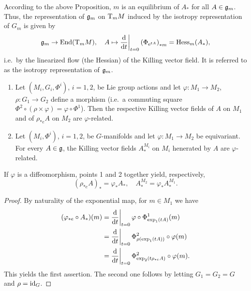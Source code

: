 \begin{rem}
    According to the above Proposition, $m$ is an equilibrium of $A_\ast$ for all $A\in\mathfrak{g}_m$. Thus, the representation of $\mathfrak{g}_m$ on $\mathrm{T}_mM$ induced by the isotropy representation of $G_m$ is given by
    \[\frakg_m\to \End(\T_mM),\quad A\mapsto \restr{\frac{\dd}{\dd t}}{t=0} \left(\Phi_{\rme^{tA}}\right)_{\ast m}=\mathrm{Hess}_m(A_\ast),\]
    i.e.~by the linearized flow (the Hessian) of the Killing vector field. It is referred to as the isotropy representation of $\mathfrak{g}_m$.
\end{rem}

\begin{prop}\label{prop 6.2.4 RS1}
    \begin{enumerate}
        \item Let $(M_i,G_i,\Phi^i)$, $i=1,2$, be Lie group actions and let $\varphi:M_1\to M_2$, $\rho:G_1\to G_2$ define a morphism (i.e.~a commuting square $\Phi^2\circ(\rho\times\varphi)=\varphi\circ\Phi^1$). Then the respective Killing vector fields of $A$ on $M_1$ and of $\rho_{\ast e} A$ on $M_2$ are $\varphi$-related.
        \item Let $(M_i,\Phi^i)$, $i=1,2$, be $G$-manifolds and let $\varphi:M_1\to M_2$ be equivariant. For every $A\in\mathfrak{g}$, the Killing vector fields $A_\ast^{M_i}$ on $M_i$ henerated by $A$ are $\varphi$-related.
    \end{enumerate}
    If $\varphi$ is a diffeomorphism, points 1 and 2 together yield, respectively,
    \[\left(\rho_{\ast e}A\right)_\ast=\varphi_{\ast}A_\ast,\quad A_\ast^{M_2}=\varphi_\ast A_\ast^{M_1}.\]
\end{prop}
\begin{proof}
    By naturality of the exponential map, for $m\in M_1$ we have
    \begin{align}
        (\varphi_{\ast e}\circ A_\ast)(m)&=\restr{\frac{\dd}{\dd t}}{t=0} \varphi\circ \Phi^1_{\exp_1(tA)}(m)\\
        &=\restr{\frac{\dd}{\dd t}}{t=0} \Phi^2_{\rho(\exp_1(tA))}\circ\varphi(m)\\
        &=\restr{\frac{\dd}{\dd t}}{t=0}\Phi^2_{\exp_2(t\rho_{\ast e}A)}\circ\varphi(m).
    \end{align}
    This yields the first assertion. The second one follows by letting $G_1=G_2=G$ and $\rho=\operatorname{id}_G$.
\end{proof}

